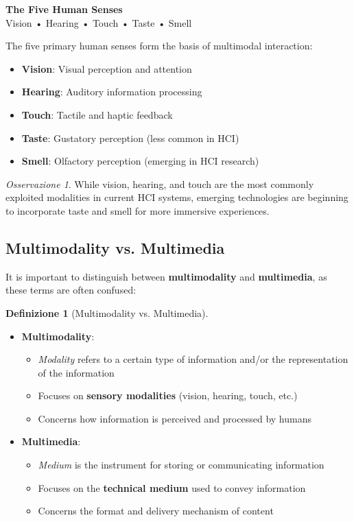 \documentclass[11pt,a4paper]{article}
\theoremstyle{definition}
\newtheorem{definition}{Definizione}[section]
\theoremstyle{plain}
\theoremstyle{remark}
\newtheorem*{observation}{Osservazione}
\begin{document}
\begin{center}
\colorbox{cyan!15}{\parbox{0.85\textwidth}{
\centering
\textbf{The Five Human Senses}\\[0.2cm]
Vision • Hearing • Touch • Taste • Smell
}}
\end{center}

The five primary human senses form the basis of multimodal interaction:

\begin{itemize}
    \item \textbf{Vision}: Visual perception and attention
    \item \textbf{Hearing}: Auditory information processing
    \item \textbf{Touch}: Tactile and haptic feedback
    \item \textbf{Taste}: Gustatory perception (less common in HCI)
    \item \textbf{Smell}: Olfactory perception (emerging in HCI research)
\end{itemize}

\begin{observation}
While vision, hearing, and touch are the most commonly exploited modalities in current HCI systems, emerging technologies are beginning to incorporate taste and smell for more immersive experiences.
\end{observation}

\subsection{Multimodality vs. Multimedia}

It is important to distinguish between \textbf{multimodality} and \textbf{multimedia}, as these terms are often confused:

\begin{definition}[Multimodality vs. Multimedia]
\begin{itemize}
    \item \textbf{Multimodality}:
    \begin{itemize}
        \item \textit{Modality} refers to a certain type of information and/or the representation of the information
        \item Focuses on \textbf{sensory modalities} (vision, hearing, touch, etc.)
        \item Concerns how information is perceived and processed by humans
    \end{itemize}
    
    \item \textbf{Multimedia}:
    \begin{itemize}
        \item \textit{Medium} is the instrument for storing or communicating information
        \item Focuses on the \textbf{technical medium} used to convey information
        \item Concerns the format and delivery mechanism of content
    \end{itemize}
\end{itemize}
\end{definition}
\end{document}
